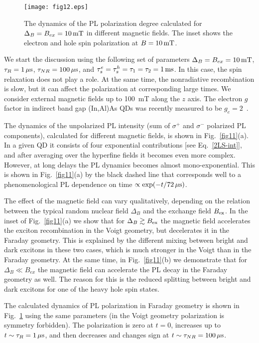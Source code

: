 \documentclass[twocolumn,showpacs,preprintnumbers,amsmath,amssymb,aps]{revtex4-1}
\begin{document}
\begin{figure}[t]
\centering
\texttt{[image: fig12.eps]}
\caption{The dynamics of the PL polarization degree calculated for
$\Delta_B = B_{ex} = 10 \, {\rm mT}$ in different magnetic fields.
The inset shows the electron and hole spin polarization at $B =
10\,{\rm mT}$.} \label{fig12}
\end{figure}

We start the discussion using the following set of parameters
$\Delta_B = B_{ex} = 10\,{\rm mT}$, $\tau_R = 1\,\mu {\rm s}$,
$\tau_{NR} = 100\, \mu {\rm s}$, and
$\tau_s^e=\tau_s^h=\tau_1=\tau_2 = 1\,{\rm ms}$. In this case, the
spin relaxation does not play a role. At the same time, the
nonradiative recombination is slow, but it can affect the
polarization at corresponding large times. We consider external
magnetic fields up to 100~mT along the $z$ axis. The electron $g$
factor in indirect band gap (In,Al)As QDs was recently measured to
be $g_e = 2$~\cite{Debus,Ivanov97}.

The dynamics of the unpolarized PL intensity (sum of $\sigma^+$ and
$\sigma^-$ polarized PL components), calculated for different
magnetic fields, is shown in Fig.~\ref{fig11}(a). In a given QD it
consists of four exponential contributions [see
Eq.~\eqref{2LS-int}], and after averaging over the hyperfine fields
it becomes even more complex. However, at long delays the PL
dynamics becomes almost mono-exponential. This is shown in
Fig.~\ref{fig11}(a) by the black dashed line that corresponds well
to a phenomenological PL dependence on time $\propto \exp(-t/ 72 \,
\mu{\rm s})$.

The effect of the magnetic field can vary qualitatively, depending
on the relation between the typical random nuclear field $\Delta_B$
and the exchange field $B_{\rm ex}$. In the inset of
Fig.~\ref{fig11}(a) we show that for $\Delta_B\gtrsim B_{\rm ex}$
the magnetic field accelerates the exciton recombination in the
Voigt geometry, but decelerates it in the Faraday geometry. This is
explained by the different mixing between bright and dark excitons
in these two cases, which is much stronger in the Voigt than in the
Faraday geometry. At the same time, in Fig.~\ref{fig11}(b) we
demonstrate that for $\Delta_B\ll B_{ex}$ the magnetic field can
accelerate the PL decay in the Faraday geometry as well. The reason
for this is the reduced splitting between bright and dark excitons
for one of the heavy hole spin states.

The calculated dynamics of PL polarization in Faraday geometry is
shown in Fig.~\ref{fig12} using the same parameters (in the Voigt
geometry polarization is symmetry forbidden). The polarization is
zero at $t=0$, increases up to $t\sim\tau_R= 1\, \mu {\rm s}$, and
then decreases and changes sign at $t\sim\tau_{NR}= 100\, \mu {\rm
s}$.
\end{document}
